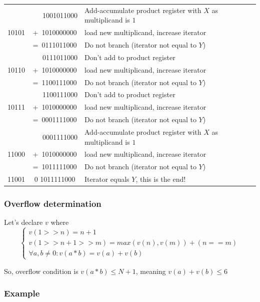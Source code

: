 \documentclass[a4paper]{report}
\begin{document}
\begin{center}
\begin{longtable}{|c|c|l|}
		\hline                  
		         & ~~~1001011000 & Add-accumulate product register with $X$ as multiplicand is $1$ \\
		10101    &  +~1010000000 & load new multiplicand, increase iterator \\
		         &  =~0111011000 & Do not branch (iterator not equal to $Y$) \\
		\hline                  
		         & ~~~0111011000 & Don't add to product register \\
		10110    &  +~1010000000 & load new multiplicand, increase iterator \\
		         &  =~1100111000 & Do not branch (iterator not equal to $Y$) \\
		\hline                  
		         & ~~~1100111000 & Don't add to product register \\
		10111    &  +~1010000000 & load new multiplicand, increase iterator \\
		         &  =~0001111000 & Do not branch (iterator not equal to $Y$) \\
		\hline                  
		         & ~~~0001111000 & Add-accumulate product register with $X$ as multiplicand is $1$ \\
		11000    &  +~1010000000 & load new multiplicand, increase iterator \\
		         &  =~1011111000 & Do not branch (iterator not equal to $Y$) \\
		\hline \hline           
		11001    & 0  1011111000 & Iterator equals $Y$, this is the end! \\
		\hline

	\end{longtable}
\end{center}

\subsubsection{Overflow determination}

Let's declare $v$ where
$$\left\lbrace
\begin{array}{lr}
	v(1>>n) = n+1 \\
	v(1>>n + 1>>m) = max(v(n),v(m)) + (n==m) \\
	\forall a,b \neq 0 : v(a*b) = v(a) + v(b)
\end{array}\right.
$$

So, overflow condition is $v(a*b) \leq N+1$, meaning $v(a)+v(b) \leq 6$

\subsubsection{Example}
\end{document}

